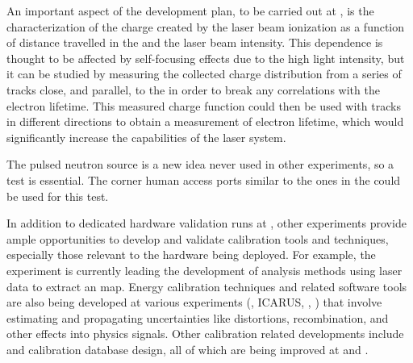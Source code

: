 An important aspect of the development plan, to be carried out at , is the characterization of the charge created by the laser beam ionization as a function of distance travelled in the  and the laser beam intensity. This dependence is thought to be affected by self-focusing effects due to the high light intensity, but it can be studied by measuring the collected charge distribution from a series of tracks close, and parallel, to the  in order to break any correlations with the electron lifetime. This measured charge function could then be used with tracks in different directions to obtain a measurement of electron lifetime, which would significantly increase the capabilities of the laser system.  

The pulsed neutron source is a new idea never used in other experiments, so a  test is essential. The corner human access ports similar to the ones in the   could be used for this test.


In addition to dedicated hardware validation runs at , other  experiments provide ample opportunities to develop and validate calibration tools and techniques, especially those relevant to the hardware being deployed. For example, the  experiment is currently leading the development of analysis methods using laser data to extract an \efield map. Energy calibration techniques and related software tools are also being developed at various experiments (, ICARUS, , ) that involve estimating and propagating uncertainties like \efield distortions, recombination, and other effects into physics signals. Other calibration related developments include  and calibration database design, all of which are being improved at  and .
 

